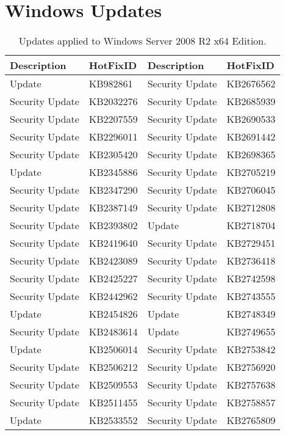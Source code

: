 \chapter{Windows Updates} \label{app:updates}
\begin{longtable}{ l | l || l | l } 
  \caption{Updates applied to Windows Server 2008 R2 x64 Edition.}
  \label{tab:Updates}
  \endfirsthead
  \endhead
  Description      & HotFixID   & Description      & HotFixID   \\ \hline
  Update           & KB982861   & Security Update  & KB2676562  \\ 
  Security Update  & KB2032276  & Security Update  & KB2685939  \\ 
  Security Update  & KB2207559  & Security Update  & KB2690533  \\ 
  Security Update  & KB2296011  & Security Update  & KB2691442  \\
  Security Update  & KB2305420  & Security Update  & KB2698365  \\
  Update           & KB2345886  & Security Update  & KB2705219  \\
  Security Update  & KB2347290  & Security Update  & KB2706045  \\
  Security Update  & KB2387149  & Security Update  & KB2712808  \\
  Security Update  & KB2393802  & Update           & KB2718704  \\
  Security Update  & KB2419640  & Security Update  & KB2729451  \\
  Security Update  & KB2423089  & Security Update  & KB2736418  \\
  Security Update  & KB2425227  & Security Update  & KB2742598  \\
  Security Update  & KB2442962  & Security Update  & KB2743555  \\
  Update           & KB2454826  & Update           & KB2748349  \\
  Security Update  & KB2483614  & Update           & KB2749655  \\
  Update           & KB2506014  & Security Update  & KB2753842  \\
  Security Update  & KB2506212  & Security Update  & KB2756920  \\
  Security Update  & KB2509553  & Security Update  & KB2757638  \\
  Security Update  & KB2511455  & Security Update  & KB2758857  \\
  Update           & KB2533552  & Security Update  & KB2765809  \\

\end{longtable}
